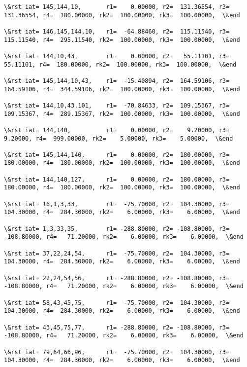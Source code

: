 \documentclass[11pt]{article}
\begin{document}
\begin{Verbatim}[commandchars=\\\{\}]
\&rst iat= 145,144,10,       r1=    0.00000, r2=  131.36554, r3=  131.36554, r4=  180.00000, rk2=  100.00000, rk3=  100.00000,  \&end

\&rst iat= 146,145,144,10,   r1=  -64.88460, r2=  115.11540, r3=  115.11540, r4=  295.11540, rk2=  100.00000, rk3=  100.00000,  \&end

\&rst iat= 144,10,43,        r1=    0.00000, r2=   55.11101, r3=   55.11101, r4=  180.00000, rk2=  100.00000, rk3=  100.00000,  \&end

\&rst iat= 145,144,10,43,    r1=  -15.40894, r2=  164.59106, r3=  164.59106, r4=  344.59106, rk2=  100.00000, rk3=  100.00000,  \&end

\&rst iat= 144,10,43,101,    r1=  -70.84633, r2=  109.15367, r3=  109.15367, r4=  289.15367, rk2=  100.00000, rk3=  100.00000,  \&end

\&rst iat= 144,140,          r1=    0.00000, r2=    9.20000, r3=    9.20000, r4=  999.00000, rk2=    5.00000, rk3=    5.00000,  \&end

\&rst iat= 145,144,140,      r1=    0.00000, r2=  180.00000, r3=  180.00000, r4=  180.00000, rk2=  100.00000, rk3=  100.00000,  \&end

\&rst iat= 144,140,127,      r1=    0.00000, r2=  180.00000, r3=  180.00000, r4=  180.00000, rk2=  100.00000, rk3=  100.00000,  \&end

\&rst iat= 16,1,3,33,        r1=  -75.70000, r2=  104.30000, r3=  104.30000, r4=  284.30000, rk2=    6.00000, rk3=    6.00000,  \&end

\&rst iat= 1,3,33,35,        r1= -288.80000, r2= -108.80000, r3= -108.80000, r4=   71.20000, rk2=    6.00000, rk3=    6.00000,  \&end

\&rst iat= 37,22,24,54,      r1=  -75.70000, r2=  104.30000, r3=  104.30000, r4=  284.30000, rk2=    6.00000, rk3=    6.00000,  \&end

\&rst iat= 22,24,54,56,      r1= -288.80000, r2= -108.80000, r3= -108.80000, r4=   71.20000, rk2=    6.00000, rk3=    6.00000,  \&end

\&rst iat= 58,43,45,75,      r1=  -75.70000, r2=  104.30000, r3=  104.30000, r4=  284.30000, rk2=    6.00000, rk3=    6.00000,  \&end

\&rst iat= 43,45,75,77,      r1= -288.80000, r2= -108.80000, r3= -108.80000, r4=   71.20000, rk2=    6.00000, rk3=    6.00000,  \&end

\&rst iat= 79,64,66,96,      r1=  -75.70000, r2=  104.30000, r3=  104.30000, r4=  284.30000, rk2=    6.00000, rk3=    6.00000,  \&end


\end{Verbatim}
\end{document}
